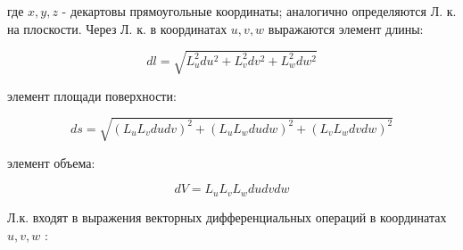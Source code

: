 \documentclass[10pt]{article}
\begin{document}
где $x, y, z$ - декартовы прямоугольные координаты; аналогично определяются Л. к. на плоскости. Через Л. к. в координатах $u, v, w$ выражаются элемент длины:



\[

d l=\sqrt{L_{u}^{2} d u^{2}+L_{v}^{2} d v^{2}+L_{w}^{2} d w^{2}}

\]



элемент площади поверхности:



\[

d s=\sqrt{\left(L_{u} L_{v} d u d v\right)^{2}+\left(L_{u} L_{w} d u d w\right)^{2}+\left(L_{v} L_{w} d v d w\right)^{2}}

\]



элемент объема:



\[

d V=L_{u} L_{v} L_{w} d u d v d w

\]



Л.к. входят в выражения векторных дифференциальных операций в координатах $u, v, w$ :
\end{document}

